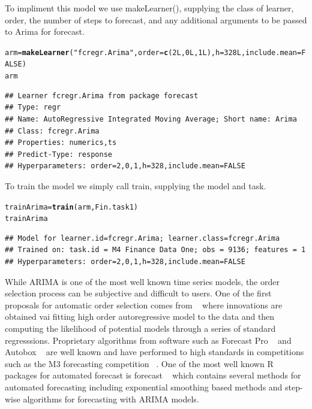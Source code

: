 \documentclass{article}\usepackage[]{graphicx}\usepackage[]{color}
\makeatletter
\newcommand{\hlnum}[1]{\textcolor[rgb]{0.686,0.059,0.569}{#1}}%
\newcommand{\hlstr}[1]{\textcolor[rgb]{0.192,0.494,0.8}{#1}}%
\newcommand{\hlstd}[1]{\textcolor[rgb]{0.345,0.345,0.345}{#1}}%
\newcommand{\hlkwb}[1]{\textcolor[rgb]{0.69,0.353,0.396}{#1}}%
\newcommand{\hlkwc}[1]{\textcolor[rgb]{0.333,0.667,0.333}{#1}}%
\newcommand{\hlkwd}[1]{\textcolor[rgb]{0.737,0.353,0.396}{\textbf{#1}}}%
\newenvironment{kframe}{%
 \def\at@end@of@kframe{}%
 \ifinner\ifhmode%
  \def\at@end@of@kframe{\end{minipage}}%
  \begin{minipage}{\columnwidth}%
 \fi\fi%
 \def\FrameCommand##1{\hskip\@totalleftmargin \hskip-\fboxsep
 \colorbox{shadecolor}{##1}\hskip-\fboxsep
     \hskip-\linewidth \hskip-\@totalleftmargin \hskip\columnwidth}%
 \MakeFramed {\advance\hsize-\width
   \@totalleftmargin\z@ \linewidth\hsize
   \@setminipage}}%
 {\par\unskip\endMakeFramed%
 \at@end@of@kframe}
\newenvironment{knitrout}{}{} %
\theoremstyle{definition}
\newcommand\code{\@codex}
\def\@codex#1{{\normalfont\ttfamily\hyphenchar\font=-1 #1}}
\let\proglang=\textsf
\newcommand{\pkg}[1]{{\fontseries{b}\selectfont #1}}
\makeatother
\begin{document}
To impliment this model we use \code{makeLearner()}, supplying the class of learner, order, the number of steps to forecast, and any additional arguments to be passed to \code{Arima} for \pkg{forecast}. 

\begin{knitrout}
\color{fgcolor}\begin{kframe}
\begin{alltt}
\hlstd{arm} \hlkwb{=} \hlkwd{makeLearner}\hlstd{(}\hlstr{"fcregr.Arima"}\hlstd{,} \hlkwc{order} \hlstd{=} \hlkwd{c}\hlstd{(}\hlnum{2L}\hlstd{,}\hlnum{0L}\hlstd{,}\hlnum{1L}\hlstd{),} \hlkwc{h} \hlstd{=} \hlnum{328L}\hlstd{,} \hlkwc{include.mean} \hlstd{=} \hlnum{FALSE}\hlstd{)}
\hlstd{arm}
\end{alltt}
\begin{verbatim}
## Learner fcregr.Arima from package forecast
## Type: regr
## Name: AutoRegressive Integrated Moving Average; Short name: Arima
## Class: fcregr.Arima
## Properties: numerics,ts
## Predict-Type: response
## Hyperparameters: order=2,0,1,h=328,include.mean=FALSE
\end{verbatim}
\end{kframe}
\end{knitrout}

To train the model we simply call train, supplying the model and task.

\begin{knitrout}
\color{fgcolor}\begin{kframe}
\begin{alltt}
\hlstd{trainArima} \hlkwb{=} \hlkwd{train}\hlstd{(arm, Fin.task1 )}
\hlstd{trainArima}
\end{alltt}
\begin{verbatim}
## Model for learner.id=fcregr.Arima; learner.class=fcregr.Arima
## Trained on: task.id = M4 Finance Data One; obs = 9136; features = 1
## Hyperparameters: order=2,0,1,h=328,include.mean=FALSE
\end{verbatim}
\end{kframe}
\end{knitrout}

While ARIMA is one of the most well known time series models, the order selection process can be subjective and difficult to users. One of the first proposals for automatic order selection comes from ~\cite{hannanOrder} where innovations are obtained vai fitting high order autoregressive model to the data and then computing the likelihood of potential models through a series of standard regresssions. Proprietary algorithms from software such as \proglang{Forecast Pro} ~\cite{forecastpro} and \proglang{Autobox} ~\cite{reillyautobox} are well known and have performed to high standards in competitions such as the M3 forecasting competition ~\cite{Makridakis2000451}. One of the most well known R packages for automated forecast is \pkg{forecast} ~\cite{HyndForecast} which contains several methods for automated forecasting including exponential smoothing based methods and step-wise algorithms for forecasting with ARIMA models.
\end{document}
